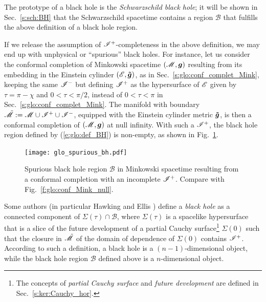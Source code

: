 \begin{example} \label{x:glo:Schwarztschild_BH}
The prototype of a black hole is the \emph{Schwarzschild black hole};
it will be shown in Sec.~\ref{s:sch:BH} that the Schwarzschild spacetime contains
a region $\mathscr{B}$ that fulfills the above definition of a black hole region.
\end{example}

\begin{remark} \label{s:glo:spurious_bh}
If we release the assumption of $\mathscr{I}^+$-completeness in the above definition,
we may end up with unphysical or ``spurious'' black holes.
For instance, let us consider the conformal completion of Minkowski spacetime
$(\mathscr{M},\bm{g})$ resulting from its embedding in the Einstein cylinder
$(\mathscr{E},\bm{\tilde{g}})$, as in
Sec.~\ref{s:glo:conf_complet_Mink},
keeping the same $\mathscr{I}^-$ but
defining $\mathscr{I}^+$ as the
hypersurface of $\mathscr{E}$ given by $\tau = \pi - \chi$
and $0<\tau<\pi/2$, instead of  $0<\tau<\pi$ in Sec.~\ref{s:glo:conf_complet_Mink}.
The manifold with boundary $\tilde{\mathscr{M}} := \mathscr{M} \cup \mathscr{I}^+ \cup \mathscr{I}^-$,
equipped with the Einstein cylinder metric $\bm{\tilde g}$, is then a conformal completion
of $(\mathscr{M},\bm{g})$ at null infinity. With such a $\mathscr{I}^+$, the black hole region
defined by (\ref{e:glo:def_BH}) is non-empty, as shown in Fig.~\ref{f:glo:spurious_bh}.
\end{remark}

\begin{figure}
\centerline{\texttt{[image: glo\_spurious\_bh.pdf]}}
\caption[]{\label{f:glo:spurious_bh} \footnotesize
Spurious black hole region $\mathscr{B}$ in Minkowski spacetime resulting
from a conformal completion with an incomplete $\mathscr{I}^+$.
Compare with Fig.~\ref{f:glo:conf_Mink_null}.}
\end{figure}


\begin{remark}
\label{r:glo:HE_BH_def}
Some authors (in particular Hawking and Ellis \cite{HawkiE73}) define a
\emph{black hole} as a connected component of
$\Sigma(\tau) \cap \mathscr{B}$, where $\Sigma(\tau)$ is a spacelike
hypersurface that is a slice of the future development of a partial
Cauchy surface\footnote{The concepts of \emph{partial Cauchy surface}
and \emph{future development} are defined in Sec.~\ref{s:ker:Cauchy_hor}.} $\Sigma(0)$ such that the
closure in $\tilde{\mathscr{M}}$ of the domain of dependence of $\Sigma(0)$ contains $\mathscr{I}^+$.
According to such a definition, a black hole is a $(n-1)$-dimensional object,
while the black hole region $\mathscr{B}$ defined above is a $n$-dimensional object.
\end{remark}

